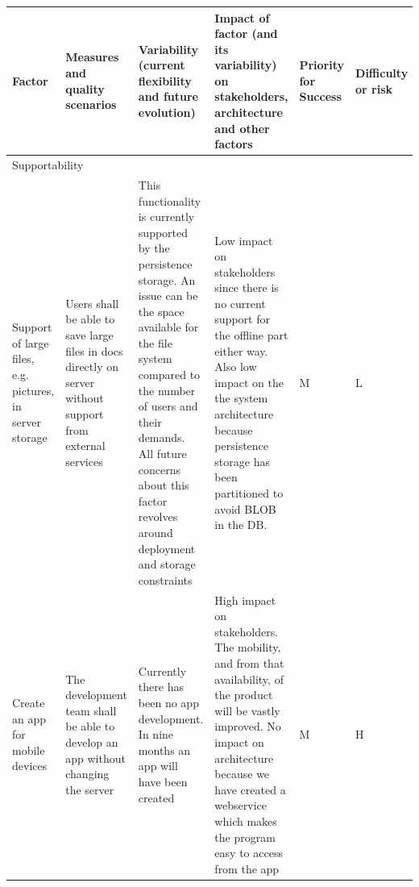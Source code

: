\documentclass[a4paper,11pt,report]{report}
\begin{document}
\begin{landscape}
\begin{table}
\begin{center}
\begin{tabular}{| p{3.3cm} | p{3.3cm} | p{3.3cm} | p{3.3cm} | p{3.3cm} | p{3.3cm} |}
    \\ \hline
        \end{tabular}
\end{center}
\end{table}
\newpage
\begin{table}
\small
\begin{center}
    \begin{tabular}{| p{3.3cm} | p{3.3cm} | p{3.3cm} | p{3.3cm} | p{3.3cm} | p{3.3cm} |}
    \hline
    Factor & Measures and quality scenarios & Variability (current flexibility and future evolution) & Impact of factor (and its variability) on stakeholders, architecture and other factors &  Priority for Success & Difficulty or risk\\ \hline
 \multicolumn{6}{|l|}{Supportability}
        \\ \hline
        Support of large files, e.g. pictures, in server storage & Users shall be able to save large files in docs directly on server without support from external services & This functionality is currently supported by the persistence storage. An issue can be the space available for the file system compared to the number of users and their demands. All future concerns about this factor revolves around deployment and storage constraints & Low impact on stakeholders since there is no current support for the offline part either way. Also low impact on the the system architecture because persistence storage has been partitioned to avoid BLOB in the DB. & M & L
        \\ \hline
        Create an app for mobile devices & The development team shall be able to develop an app without changing the server & Currently there has been no app development. In nine months an app will have been created & High impact on stakeholders. The mobility, and from that availability, of the product will be vastly improved. No impact on architecture because we have created a webservice which makes the program easy to access from the app & M & H
        \\ \hline
        \end{tabular}
\end{center}
\end{table}


\end{landscape}
\end{document}
